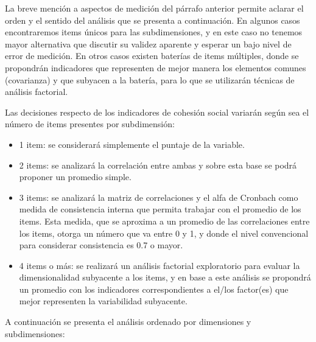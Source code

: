 \documentclass[
  12pt,
]{book}
\begin{document}
La breve mención a aspectos de medición del párrafo anterior permite aclarar el orden y el sentido del análisis que se presenta a continuación. En algunos casos encontraremos items únicos para las subdimensiones, y en este caso no tenemos mayor alternativa que discutir su validez aparente y esperar un bajo nivel de error de medición. En otros casos existen baterías de items múltiples, donde se propondrán indicadores que representen de mejor manera los elementos comunes (covarianza) y que subyacen a la batería, para lo que se utilizarán técnicas de análisis factorial.

Las decisiones respecto de los indicadores de cohesión social variarán según sea el número de items presentes por subdimensión:

\begin{itemize}
\item
  1 item: se considerará simplemente el puntaje de la variable.
\item
  2 items: se analizará la correlación entre ambas y sobre esta base se podrá proponer un promedio simple.
\item
  3 items: se analizará la matriz de correlaciones y el alfa de Cronbach como medida de consistencia interna que permita trabajar con el promedio de los items. Esta medida, que se aproxima a un promedio de las correlaciones entre los items, otorga un número que va entre 0 y 1, y donde el nivel convencional para considerar consistencia es 0.7 o mayor.
\item
  4 items o más: se realizará un análisis factorial exploratorio para evaluar la dimensionalidad subyacente a los items, y en base a este análisis se propondrá un promedio con los indicadores correspondientes a el/los factor(es) que mejor representen la variabilidad subyacente.
\end{itemize}

A continuación se presenta el análisis ordenado por dimensiones y subdimensiones:
\end{document}

